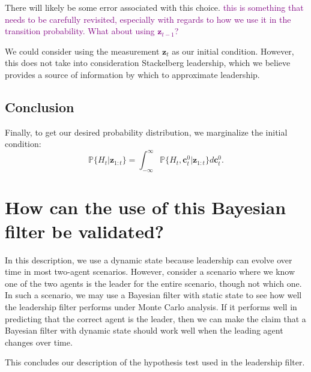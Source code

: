 \documentclass[11pt]{article}
\newcommand\obs[1]{\bm{z}_{#1}}
\newcommand\prob[1]{\mathbb{P}{\{#1\}}}
\newcommand\initcond[1]{\bm{c}^{0}_{#1}}
\newcommand\comment[1]{\textcolor{purple}{#1}}
\begin{document}
There will likely be some error associated with this choice. {\comment{this is something that needs to be carefully revisited, especially with regards to how we use it in the transition probability. What about using $\obs{t-1}$?}}

We could consider using the measurement $\obs{t}$ as our initial condition. However, this does not take into consideration Stackelberg leadership, which we believe provides a source of information by which to approximate leadership.

\subsection{Conclusion}
Finally, to get our desired probability distribution, we marginalize the initial condition:
\begin{equation}
\prob{H_t | \obs{1:t}} = \int_{-\infty}^\infty \prob{H_t, \initcond{t} | \obs{1:t}} d\initcond{t}.
\end{equation} 



\section{How can the use of this Bayesian filter be validated?}
In this description, we use a dynamic state because leadership can evolve over time in most two-agent scenarios. However, consider a scenario where we know one of the two agents is the leader for the entire scenario, though not which one. In such a scenario, we may use a Bayesian filter with static state to see how well the leadership filter performs under Monte Carlo analysis. If it performs well in predicting that the correct agent is the leader, then we can make the claim that a Bayesian filter with dynamic state should work well when the leading agent changes over time.


This concludes our description of the hypothesis test used in the leadership filter.
\end{document}
